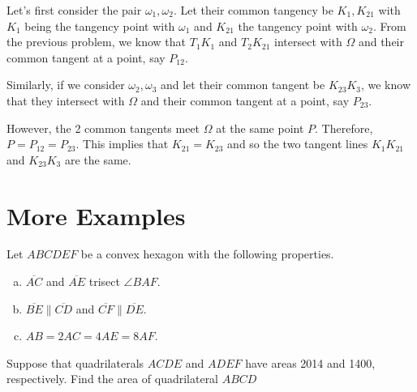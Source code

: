 \documentclass[11pt,twoside]{scrartcl}
\begin{document}
    Let's first consider the pair $\omega_1, \omega_2$. Let their common tangency be $K_1, K_{21}$ with $K_1$ being the tangency point with $\omega_1$ and $K_{21}$  the tangency point with $\omega_2$. From the previous problem, we know that $T_1K_1$ and $T_2K_{21}$ intersect with $\Omega$ and their common tangent at a point, say $P_{12}$.

    Similarly, if we consider $\omega_2, \omega_3$ and let their common tangent be $K_{23}K_3$, we know that they intersect with $\Omega$ and their common tangent at a point, say $P_{23}$.

    However, the 2 common tangents meet $\Omega$ at the same point $P$. Therefore, $P = P_{12} = P_{23}$. This implies that $K_{21} = K_{23}$ and so the two tangent lines $K_1K_{21}$ and $K_{23}K_3$ are the same.

\clearpage
\section{More Examples}
\begin{example} \label{hmmt_nov14_team_10}
    Let $ABCDEF$ be a convex hexagon with the following properties.
    \begin{enumerate}[a)]
        \item $\overline{AC}$ and $\overline{AE}$ trisect $\angle BAF$.
        \item $\overline{BE} \parallel \overline{CD}$ and $\overline{CF} \parallel \overline{DE}$.
        \item $AB = 2AC = 4AE = 8AF$.
    \end{enumerate}
    Suppose that quadrilaterals $ACDE$ and $ADEF$ have areas 2014 and 1400, respectively. Find the area of quadrilateral $ABCD$

\end{example}
\end{document}

